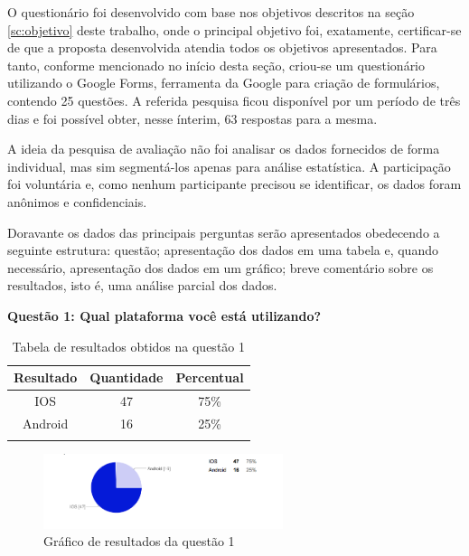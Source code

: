 O questionário foi desenvolvido com base nos objetivos descritos na seção \ref{sc:objetivo} deste trabalho, onde o principal objetivo foi, exatamente, certificar-se de que a proposta desenvolvida atendia todos os objetivos apresentados. Para tanto, conforme mencionado no início desta seção, criou-se um questionário utilizando o Google Forms, ferramenta da Google para criação de formulários, contendo 25 questões. A referida pesquisa ficou disponível por um período de três dias e foi possível obter, nesse ínterim, 63 respostas para a mesma.  

A ideia da pesquisa de avaliação não foi analisar os dados fornecidos de forma individual, mas sim segmentá-los apenas para análise estatística. A participação foi voluntária e, como nenhum participante precisou se identificar, os dados foram anônimos e confidenciais.    

Doravante os dados das principais perguntas serão apresentados obedecendo a seguinte estrutura: questão; apresentação dos dados em uma tabela e, quando necessário, apresentação dos dados em um gráfico; breve comentário sobre os resultados, isto é, uma análise parcial dos dados.

\textbf{Questão 1:  Qual plataforma você está utilizando?}

\begin{center}
\begin{longtable}{c|c|c}
\hline
    \multicolumn{1}{c}{\textbf{Resultado}} & \multicolumn{1}{c}{\textbf{Quantidade}} & \multicolumn{1}{c}{\textbf{Percentual}} \\
\hline
    IOS & 47 &  75\%\\
    \hline
    Android & 16 & 25\%\\
    \hline
\caption{Tabela de resultados obtidos na questão 1}
\end{longtable}
\end{center}


\begin{figure}[h]
\begin{center}
  \includegraphics[width=7cm]{images/graficos/questao1.png}
  \caption{Gráfico de resultados da questão 1}
  \label{fig:questao1}
\end{center}
\end{figure}

